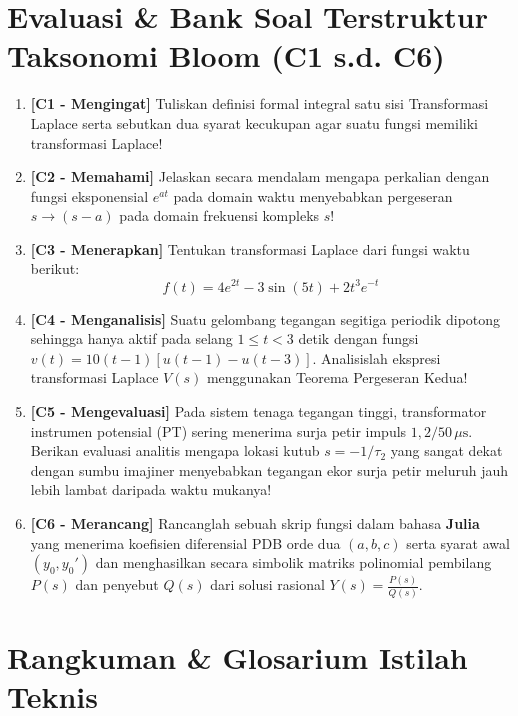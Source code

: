 \documentclass[11pt,a4paper]{article}
\theoremstyle{definition}
\begin{document}
\section{Evaluasi \& Bank Soal Terstruktur Taksonomi Bloom (C1 s.d. C6)}

\begin{enumerate}[leftmargin=*]
    \item \textbf{[C1 - Mengingat]} Tuliskan definisi formal integral satu sisi Transformasi Laplace serta sebutkan dua syarat kecukupan agar suatu fungsi memiliki transformasi Laplace!
    
    \item \textbf{[C2 - Memahami]} Jelaskan secara mendalam mengapa perkalian dengan fungsi eksponensial $e^{at}$ pada domain waktu menyebabkan pergeseran $s \to (s - a)$ pada domain frekuensi kompleks $s$!
    
    \item \textbf{[C3 - Menerapkan]} Tentukan transformasi Laplace dari fungsi waktu berikut:
    \begin{equation*}
        f(t) = 4 e^{2t} - 3 \sin(5t) + 2 t^3 e^{-t}
    \end{equation*}
    
    \item \textbf{[C4 - Menganalisis]} Suatu gelombang tegangan segitiga periodik dipotong sehingga hanya aktif pada selang $1 \le t < 3$ detik dengan fungsi $v(t) = 10(t - 1) [u(t - 1) - u(t - 3)]$. Analisislah ekspresi transformasi Laplace $V(s)$ menggunakan Teorema Pergeseran Kedua!
    
    \item \textbf{[C5 - Mengevaluasi]} Pada sistem tenaga tegangan tinggi, transformator instrumen potensial (PT) sering menerima surja petir impuls $1{,}2/50\,\mu\text{s}$. Berikan evaluasi analitis mengapa lokasi kutub $s = -1/\tau_2$ yang sangat dekat dengan sumbu imajiner menyebabkan tegangan ekor surja petir meluruh jauh lebih lambat daripada waktu mukanya!
    
    \item \textbf{[C6 - Merancang]} Rancanglah sebuah skrip fungsi dalam bahasa \textbf{Julia} yang menerima koefisien diferensial PDB orde dua $(a, b, c)$ serta syarat awal $(y_0, y_0')$ dan menghasilkan secara simbolik matriks polinomial pembilang $P(s)$ dan penyebut $Q(s)$ dari solusi rasional $Y(s) = \frac{P(s)}{Q(s)}$.
\end{enumerate}

\section{Rangkuman \& Glosarium Istilah Teknis}
\end{document}
